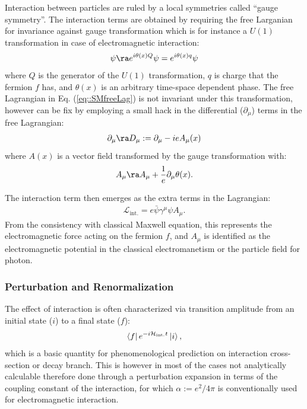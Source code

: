 Interaction between particles are ruled by a local symmetries called ``gauge symmetry''. 
The interaction terms are obtained by requiring the free Larganian for invariance against gauge transformation which is for instance a $U(1)$ transformation in case of electromagnetic interaction:
\begin{align}
\psi \ra e^{i\theta(x) Q} \psi = e^{i\theta(x) q} \psi
\end{align}
where $Q$ is the generator of the $U(1)$ transformation, $q$ is charge that the fermion $f$ has, and $\theta(x)$ is an arbitrary time-space dependent phase.
The free Lagrangian in Eq. (\ref{eq::SMfreeLag}) is not invariant under this transformation, however can be fix by employing a small hack in the differential ($\partial_\mu$) terms in the free Lagrangian:
\begin{align}
\partial_\mu \ra D_\mu := \partial_\mu - ieA_\mu (x)
\end{align}
where $A(x)$ is a vector field transformed by the gauge transformation with:
\begin{align}
A_\mu \ra A_\mu + \frac{1}{e} \partial_\mu \theta(x).
\end{align}

The interaction term then emerges as the extra terms in the Lagrangian:
\begin{align}
\mathcal{L}_{\mathrm{int.}} = e\bar{\psi} \gamma^\mu \psi A_\mu.
\label{eq::SMfreeLag}
\end{align}
From the consistency with classical Maxwell equation, this represents the electromagnetic force acting on the fermion $f$, and $A_\mu$ is identified as the electromagnetic potential in the classical electromanetism or the particle field for photon. \\



\subsubsection{Perturbation and Renormalization}
The effect of interaction is often characterized via transition amplitude from an initial state ($i$) to a final state ($f$):
\begin{align}
\bra{f} e^{-i\mathcal{H}_{\mathrm{int.}}t} \ket{i},
\end{align}
which is a basic quantity for phenomenological prediction on interaction cross-section or decay branch. 
This is however in most of the cases not analytically calculable therefore done through a perturbation expansion in terms of the coupling constant of the interaction, for which $\alpha := e^2/4\pi$ is conventionally used for electromagnetic interaction.  \\

